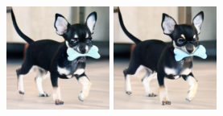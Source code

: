 \begin{figure}[h]
\begin{minipage}{0.15\textwidth}
    \end{minipage}
    \begin{minipage}{0.15\textwidth}
        \centering
        \includegraphics[width=\linewidth]{material/65k/118.png}
    \end{minipage}
    \begin{minipage}{0.15\textwidth}
        \centering
        \includegraphics[width=\linewidth]{material/262k/118.png}
    \end{minipage}



\end{figure}
